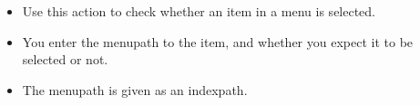 \begin{itemize}
\item Use this action to check whether an item in a menu is selected.
\item You enter the menupath to the item, and whether you expect it to be selected or not.
\item The menupath is given as an indexpath. 
\end{itemize}

